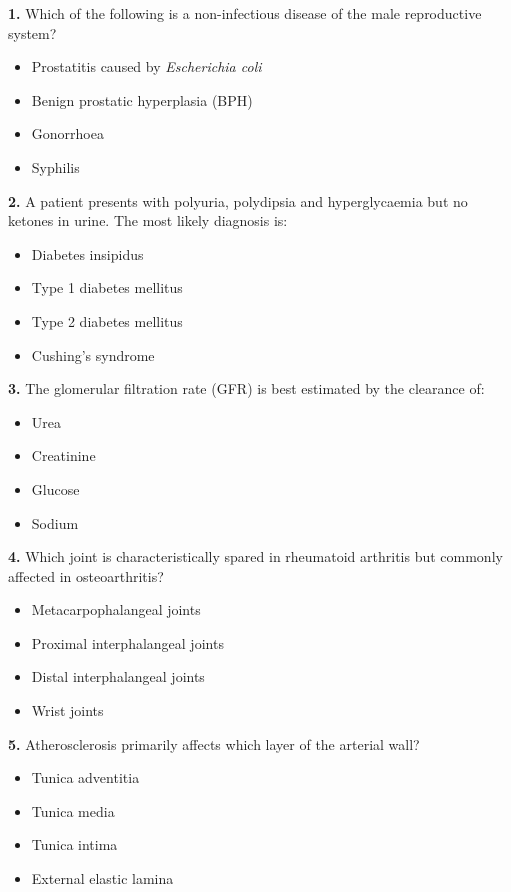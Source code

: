 \documentclass[11pt]{article}
\begin{document}
\begin{exercice}
\textbf{1.} Which of the following is a non-infectious disease of the male reproductive system?
\begin{itemize}
\item[A] Prostatitis caused by \emph{Escherichia coli}
\item[B] Benign prostatic hyperplasia (BPH)
\item[C] Gonorrhoea
\item[D] Syphilis
\end{itemize}

\textbf{2.} A patient presents with polyuria, polydipsia and hyperglycaemia but no ketones in urine. The most likely diagnosis is:
\begin{itemize}
\item[A] Diabetes insipidus
\item[B] Type 1 diabetes mellitus
\item[C] Type 2 diabetes mellitus
\item[D] Cushing's syndrome
\end{itemize}

\textbf{3.} The glomerular filtration rate (GFR) is best estimated by the clearance of:
\begin{itemize}
\item[A] Urea
\item[B] Creatinine
\item[C] Glucose
\item[D] Sodium
\end{itemize}

\textbf{4.} Which joint is characteristically spared in rheumatoid arthritis but commonly affected in osteoarthritis?
\begin{itemize}
\item[A] Metacarpophalangeal joints
\item[B] Proximal interphalangeal joints
\item[C] Distal interphalangeal joints
\item[D] Wrist joints
\end{itemize}

\textbf{5.} Atherosclerosis primarily affects which layer of the arterial wall?
\begin{itemize}
\item[A] Tunica adventitia
\item[B] Tunica media
\item[C] Tunica intima
\item[D] External elastic lamina
\end{itemize}
\end{exercice}
\end{document}
